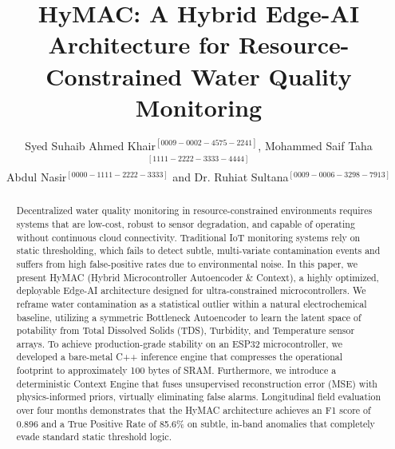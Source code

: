 \documentclass[runningheads]{llncs}
\begin{document}
%
\title{HyMAC: A Hybrid Edge-AI Architecture for Resource-Constrained Water Quality Monitoring}
%
%
\author{Syed Suhaib Ahmed Khair$^{[0009-0002-4575-2241]}$, Mohammed Saif Taha$^{[1111-2222-3333-4444]}$\\[1ex]
Abdul Nasir$^{[0000-1111-2222-3333]}$ and Dr. Ruhiat Sultana$^{[0009-0006-3298-7913]}$}
%
%
%
\maketitle

\begin{abstract}
Decentralized water quality monitoring in resource-constrained environments requires systems that are low-cost, robust to sensor degradation, and capable of operating without continuous cloud connectivity. Traditional IoT monitoring systems rely on static thresholding, which fails to detect subtle, multi-variate contamination events and suffers from high false-positive rates due to environmental noise. In this paper, we present HyMAC (Hybrid Microcontroller Autoencoder \& Context), a highly optimized, deployable Edge-AI architecture designed for ultra-constrained microcontrollers. We reframe water contamination as a statistical outlier within a natural electrochemical baseline, utilizing a symmetric Bottleneck Autoencoder to learn the latent space of potability from Total Dissolved Solids (TDS), Turbidity, and Temperature sensor arrays. To achieve production-grade stability on an ESP32 microcontroller, we developed a bare-metal C++ inference engine that compresses the operational footprint to approximately 100 bytes of SRAM. Furthermore, we introduce a deterministic Context Engine that fuses unsupervised reconstruction error (MSE) with physics-informed priors, virtually eliminating false alarms. Longitudinal field evaluation over four months demonstrates that the HyMAC architecture achieves an F1 score of 0.896 and a True Positive Rate of 85.6\% on subtle, in-band anomalies that completely evade standard static threshold logic.

\end{abstract}
\end{document}
